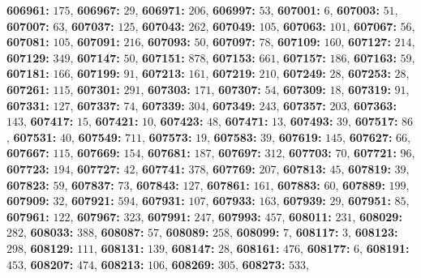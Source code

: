 \textsf{\bfseries 606961:} $175$, \textsf{\bfseries 606967:} $29$, \textsf{\bfseries 606971:} $206$, \textsf{\bfseries 606997:} $53$, \textsf{\bfseries 607001:} $6$, \textsf{\bfseries 607003:} $51$, \textsf{\bfseries 607007:} $63$, \textsf{\bfseries 607037:} $125$, \textsf{\bfseries 607043:} $262$, \textsf{\bfseries 607049:} $105$, \textsf{\bfseries 607063:} $101$, \textsf{\bfseries 607067:} $56$, \textsf{\bfseries 607081:} $105$, \textsf{\bfseries 607091:} $216$, \textsf{\bfseries 607093:} $50$, \textsf{\bfseries 607097:} $78$, \textsf{\bfseries 607109:} $160$, \textsf{\bfseries 607127:} $214$, \textsf{\bfseries 607129:} $349$, \textsf{\bfseries 607147:} $50$, \textsf{\bfseries 607151:} $878$, \textsf{\bfseries 607153:} $661$, \textsf{\bfseries 607157:} $186$, \textsf{\bfseries 607163:} $59$, \textsf{\bfseries 607181:} $166$, \textsf{\bfseries 607199:} $91$, \textsf{\bfseries 607213:} $161$, \textsf{\bfseries 607219:} $210$, \textsf{\bfseries 607249:} $28$, \textsf{\bfseries 607253:} $28$, \textsf{\bfseries 607261:} $115$, \textsf{\bfseries 607301:} $291$, \textsf{\bfseries 607303:} $171$, \textsf{\bfseries 607307:} $54$, \textsf{\bfseries 607309:} $18$, \textsf{\bfseries 607319:} $91$, \textsf{\bfseries 607331:} $127$, \textsf{\bfseries 607337:} $74$, \textsf{\bfseries 607339:} $304$, \textsf{\bfseries 607349:} $243$, \textsf{\bfseries 607357:} $203$, \textsf{\bfseries 607363:} $143$, \textsf{\bfseries 607417:} $15$, \textsf{\bfseries 607421:} $10$, \textsf{\bfseries 607423:} $48$, \textsf{\bfseries 607471:} $13$, \textsf{\bfseries 607493:} $39$, \textsf{\bfseries 607517:} $86$, \textsf{\bfseries 607531:} $40$, \textsf{\bfseries 607549:} $711$, \textsf{\bfseries 607573:} $19$, \textsf{\bfseries 607583:} $39$, \textsf{\bfseries 607619:} $145$, \textsf{\bfseries 607627:} $66$, \textsf{\bfseries 607667:} $115$, \textsf{\bfseries 607669:} $154$, \textsf{\bfseries 607681:} $187$, \textsf{\bfseries 607697:} $312$, \textsf{\bfseries 607703:} $70$, \textsf{\bfseries 607721:} $96$, \textsf{\bfseries 607723:} $194$, \textsf{\bfseries 607727:} $42$, \textsf{\bfseries 607741:} $378$, \textsf{\bfseries 607769:} $207$, \textsf{\bfseries 607813:} $45$, \textsf{\bfseries 607819:} $39$, \textsf{\bfseries 607823:} $59$, \textsf{\bfseries 607837:} $73$, \textsf{\bfseries 607843:} $127$, \textsf{\bfseries 607861:} $161$, \textsf{\bfseries 607883:} $60$, \textsf{\bfseries 607889:} $199$, \textsf{\bfseries 607909:} $32$, \textsf{\bfseries 607921:} $594$, \textsf{\bfseries 607931:} $107$, \textsf{\bfseries 607933:} $163$, \textsf{\bfseries 607939:} $29$, \textsf{\bfseries 607951:} $85$, \textsf{\bfseries 607961:} $122$, \textsf{\bfseries 607967:} $323$, \textsf{\bfseries 607991:} $247$, \textsf{\bfseries 607993:} $457$, \textsf{\bfseries 608011:} $231$, \textsf{\bfseries 608029:} $282$, \textsf{\bfseries 608033:} $388$, \textsf{\bfseries 608087:} $57$, \textsf{\bfseries 608089:} $258$, \textsf{\bfseries 608099:} $7$, \textsf{\bfseries 608117:} $3$, \textsf{\bfseries 608123:} $298$, \textsf{\bfseries 608129:} $111$, \textsf{\bfseries 608131:} $139$, \textsf{\bfseries 608147:} $28$, \textsf{\bfseries 608161:} $476$, \textsf{\bfseries 608177:} $6$, \textsf{\bfseries 608191:} $453$, \textsf{\bfseries 608207:} $474$, \textsf{\bfseries 608213:} $106$, \textsf{\bfseries 608269:} $305$, \textsf{\bfseries 608273:} $533$, 
